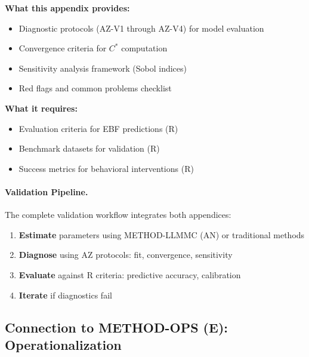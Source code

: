 \begin{tcolorbox}[colback=yellow!5!white, colframe=yellow!75!black,
    title=Integration: METHOD-CONSTRUCT $\leftrightarrow$ METHOD-EVAL (R)]
\textbf{What this appendix provides:}
\begin{itemize}[nosep]
\item Diagnostic protocols (AZ-V1 through AZ-V4) for model evaluation
\item Convergence criteria for $C^*$ computation
\item Sensitivity analysis framework (Sobol indices)
\item Red flags and common problems checklist
\end{itemize}

\textbf{What it requires:}
\begin{itemize}[nosep]
\item Evaluation criteria for EBF predictions (R)
\item Benchmark datasets for validation (R)
\item Success metrics for behavioral interventions (R)
\end{itemize}
\end{tcolorbox}

\paragraph{Validation Pipeline.}
The complete validation workflow integrates both appendices:
\begin{enumerate}
\item \textbf{Estimate} parameters using METHOD-LLMMC (AN) or traditional methods
\item \textbf{Diagnose} using AZ protocols: fit, convergence, sensitivity
\item \textbf{Evaluate} against R criteria: predictive accuracy, calibration
\item \textbf{Iterate} if diagnostics fail
\end{enumerate}

\subsection{Connection to METHOD-OPS (E): Operationalization}

